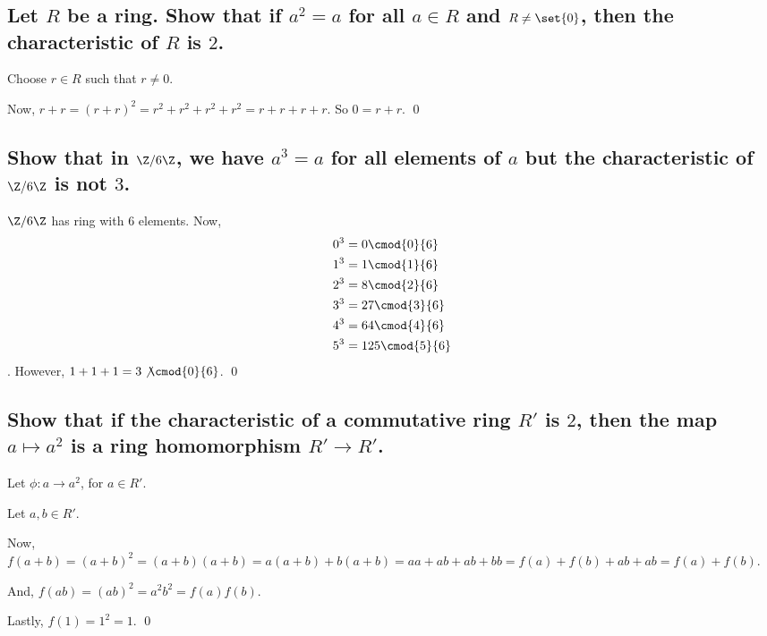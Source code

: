 \section[Problem 4]{}
    \subsection[(i)]{Let $R$ be a ring. Show that if $a^2 = a$ for all $a \in R$ and $R \neq \set{0}$,
        then the characteristic of $R$ is $2$.}

        Choose $r \in R$ such that $r \neq 0$.

        Now, $r + r = (r+r)^2 = r^2 + r^2 + r^2 + r^2 = r + r + r + r$.
        So $0 = r + r$.
        \qed

    \subsection[(ii)]{Show that in $\Z/6\Z$, we have $a^3 = a$ for all elements of $a$ but 
        the characteristic of $\Z/6\Z$ is not $3$.}

        \newcommand\fourb{\Z/6\Z}


        $\fourb$ has ring with 6 elements.
        Now, 
        \begin{align*}
            &0^3 = 0 \cmod{0}{6} \\
            &1^3 = 1 \cmod{1}{6} \\
            &2^3 = 8 \cmod{2}{6} \\
            &3^3 = 27 \cmod{3}{6} \\
            &4^3 = 64 \cmod{4}{6} \\
            &5^3 = 125 \cmod{5}{6} 
        \end{align*}.
        However, $ 1 + 1 + 1 = 3 \not\cmod{0}{6}$.
        \qed

    \subsection[(iii)]{Show that if the characteristic of a commutative ring $R'$ is $2$, then the map
        $a \mapsto a^2$ is a ring homomorphism $R' \to R'$.}

        Let $\phi: a \to a^2$, for $a \in R'$.

        Let $a, b \in R'$.

        Now, $f(a+b) = (a+b)^2 = (a+b)(a+b) = a(a+b) + b(a+b) = aa + ab + ab + bb
        = f(a) + f(b) + ab + ab = f(a) + f(b)$.

        And, $f(ab) = (ab)^2 = a^2 b^2 = f(a)f(b)$.

        Lastly, $f(1) = 1^2 = 1$.
        \qed